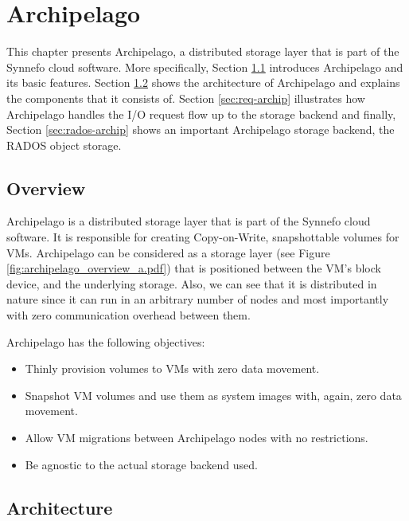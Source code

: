 \chapter{Archipelago}\label{ch:archip}

This chapter presents Archipelago, a distributed storage layer that is part of 
the Synnefo cloud software. More specifically, Section 
\ref{sec:overview-archip} introduces Archipelago and its basic features.  
Section \ref{sec:arch-archip} shows the architecture of Archipelago and 
explains the components that it consists of. Section \ref{sec:req-archip} 
illustrates how Archipelago handles the I/O request flow up to the storage 
backend and finally, Section \ref{sec:rados-archip} shows an important 
Archipelago storage backend, the RADOS object storage.

\section{Overview}\label{sec:overview-archip}

Archipelago is a distributed storage layer that is part of the Synnefo cloud 
software. It is responsible for creating Copy-on-Write, snapshottable volumes 
for VMs.  Archipelago can be considered as a storage layer (see Figure 
\ref{fig:archipelago_overview_a.pdf}) that is positioned between the VM's block 
device, and the underlying storage. Also, we can see that it is distributed in 
nature since it can run in an arbitrary number of nodes and most importantly 
with zero communication overhead between them.


Archipelago has the following objectives:

\begin{itemize}
	\item Thinly provision volumes to VMs with zero data movement.
	\item Snapshot VM volumes and use them as system images with, again, zero 
		data movement.
	\item Allow VM migrations between Archipelago nodes with no restrictions.
	\item Be agnostic to the actual storage backend used.
\end{itemize}

\section{Architecture}\label{sec:arch-archip}

